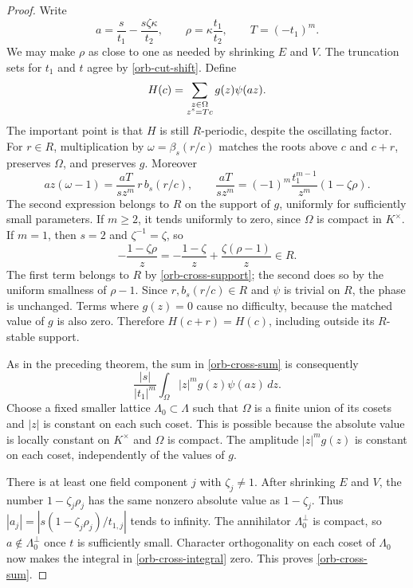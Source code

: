 \begin{proof}
Write
\[
 a=\frac{s}{t_1}-\frac{s\zeta\kappa}{t_2},\qquad
 \rho=\kappa\frac{t_1}{t_2},\qquad
 T=(-t_1)^m.
\]
We may make $\rho$ as close to one as needed by shrinking $E$
and $V$.  The truncation sets for $t_1$ and $t$ agree by
\eqref{orb-cut-shift}.  Define
\[
 H(c)=\sum_{\substack{z\in\Omega\cr z^s=Tc}}
             g(z)\psi(az).
\]
The important point is that $H$ is still $R$-periodic, despite
the oscillating factor.  For $r\in R$, multiplication by
$\omega=\beta_s(r/c)$ matches the roots above $c$ and $c+r$,
preserves $\Omega$, and preserves $g$.  Moreover
\[
 az(\omega-1)=\frac{aT}{s z^m}\,r\,b_s(r/c),\qquad
 \frac{aT}{s z^m}
    =(-1)^m\frac{t_1^{m-1}}{z^m}(1-\zeta\rho).
\]
The second expression belongs to $R$ on the support of $g$,
uniformly for sufficiently small parameters.  If $m\ge2$, it
tends uniformly to zero, since $\Omega$ is compact in $K^\times$.
If $m=1$, then $s=2$ and $\zeta^{-1}=\zeta$, so
\[
 -\frac{1-\zeta\rho}{z}
 =-\frac{1-\zeta}{z}+\frac{\zeta(\rho-1)}{z}\in R.
\]
The first term belongs to $R$ by \eqref{orb-cross-support};
the second does so by the uniform smallness of $\rho-1$.
Since $r,b_s(r/c)\in R$ and $\psi$ is trivial on $R$, the
phase is unchanged.  Terms where $g(z)=0$ cause no difficulty,
because the matched value of $g$ is also zero.  Therefore
$H(c+r)=H(c)$, including outside its $R$-stable support.

As in the preceding theorem, the sum in \eqref{orb-cross-sum}
is consequently
\begin{equation}\label{orb-cross-integral}
 \frac{|s|}{|t_1|^m}
       \int_\Omega |z|^m g(z)\psi(az)\,dz.
\end{equation}
Choose a fixed smaller lattice $\Lambda_0\subset\Lambda$
such that $\Omega$ is a finite union of its cosets and $|z|$
is constant on each such coset.  This is possible because the
absolute value is locally constant on $K^\times$ and $\Omega$
is compact.  The amplitude $|z|^m g(z)$ is constant on each coset,
independently of the values of $g$.

There is at least one field component $j$ with $\zeta_j\ne1$.
After shrinking $E$ and $V$, the number $1-\zeta_j\rho_j$
has the same nonzero absolute value as $1-\zeta_j$.
Thus $|a_j|=|s(1-\zeta_j\rho_j)/t_{1,j}|$ tends to infinity.
The annihilator $\Lambda_0^\perp$ is compact, so
$a\notin\Lambda_0^\perp$ once $t$ is sufficiently small.
Character orthogonality on each coset of $\Lambda_0$ now makes
the integral in \eqref{orb-cross-integral} zero.  This proves
\eqref{orb-cross-sum}.
\end{proof}

